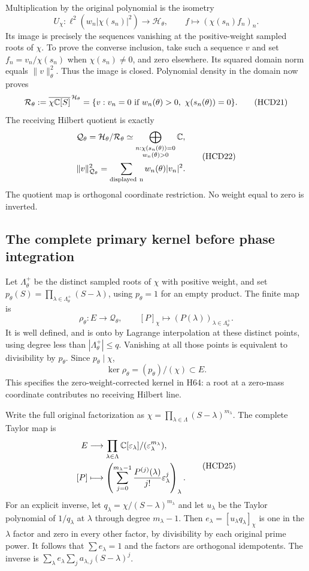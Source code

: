 Multiplication by the original polynomial is the isometry
\[
 U_\chi:\ell^2(w_n|\chi(s_n)|^2)\longrightarrow\mathcal H_\theta,
 \qquad f\longmapsto(\chi(s_n)f_n)_n.
 \tag{HCD20}
\]
Its image is precisely the sequences vanishing at the
positive-weight sampled roots of $\chi$. To prove the
converse inclusion, take such a sequence $v$ and set
$f_n=v_n/\chi(s_n)$ when $\chi(s_n)\ne0$, and zero
elsewhere. Its squared domain norm equals $\|v\|_\theta^2$.
Thus the image is closed. Polynomial density in the domain
now proves
\[
 \mathcal R_\theta:=
 \overline{\chi\mathbb{C}[S]}^{\,\mathcal H_\theta}
 =\{v:v_n=0\text{ if }w_n(\theta)>0,\ \chi(s_n(\theta))=0\}.
 \tag{HCD21}
\]
The receiving Hilbert quotient is exactly
\[
 \begin{gathered}
 \mathcal Q_\theta=\mathcal H_\theta/\mathcal R_\theta
 \simeq
 \bigoplus_{\substack{n:\chi(s_n(\theta))=0\\w_n(\theta)>0}}\mathbb{C},\\
 \|v\|_{\mathcal Q_\theta}^2
 =\sum_{\rm displayed\ n}w_n(\theta)|v_n|^2.
 \end{gathered}
 \tag{HCD22}
\]
The quotient map is orthogonal coordinate restriction.
No weight equal to zero is inverted.

\subsection{The complete primary kernel before phase integration}

Let $\Lambda_\theta^+$ be the distinct sampled roots of
$\chi$ with positive weight, and set
$p_\theta(S)=\prod_{\lambda\in\Lambda_\theta^+}(S-\lambda)$,
using $p_\theta=1$ for an empty product.
The finite map is
\[
 \rho_\theta:E\longrightarrow\mathcal Q_\theta,\qquad
 [P]_\chi\longmapsto(P(\lambda))_{\lambda\in\Lambda_\theta^+}.
 \tag{HCD23}
\]
It is well defined, and is onto by Lagrange interpolation
at these distinct points, using degree less than
$|\Lambda_\theta^+|\le q$. Vanishing at all those points
is equivalent to divisibility by $p_\theta$. Since
$p_\theta\mid\chi$,
\[
 \ker\rho_\theta=(p_\theta)/(\chi)\subset E.
 \tag{HCD24}
\]
This specifies the zero-weight-corrected kernel in H64:
a root at a zero-mass coordinate contributes no receiving
Hilbert line.

Write the full original factorization as
$\chi=\prod_{\lambda\in\Lambda}(S-\lambda)^{m_\lambda}$.
The complete Taylor map is
\[
 \begin{split}
 E&\longrightarrow\prod_{\lambda\in\Lambda}
 \mathbb{C}[\varepsilon_\lambda]/(\varepsilon_\lambda^{m_\lambda}),\\
 [P]&\longmapsto\left(
 \sum_{j=0}^{m_\lambda-1}\frac{P^{(j)}(\lambda)}{j!}
 \varepsilon_\lambda^j\right)_\lambda.
 \end{split}
 \tag{HCD25}
\]
For an explicit inverse, let
$q_\lambda=\chi/(S-\lambda)^{m_\lambda}$ and let
$u_\lambda$ be the Taylor polynomial of $1/q_\lambda$
at $\lambda$ through degree $m_\lambda-1$.
Then $e_\lambda=[u_\lambda q_\lambda]_\chi$ is one
in the $\lambda$ factor and zero in every other factor,
by divisibility by each original prime power. It follows
that $\sum e_\lambda=1$ and the factors are orthogonal
idempotents. The inverse is
$\sum_\lambda e_\lambda\sum_j a_{\lambda,j}(S-\lambda)^j$.

